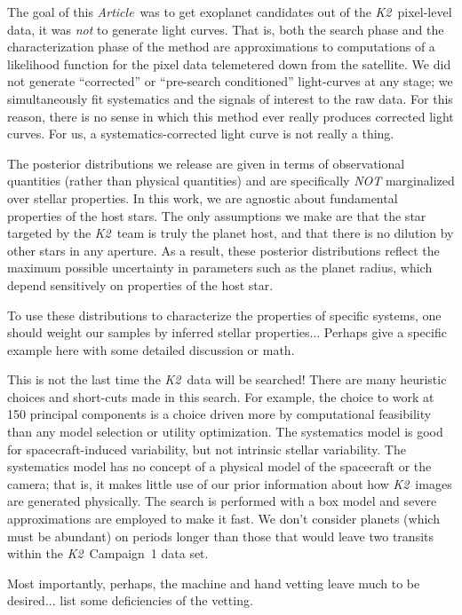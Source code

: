 \documentclass[12pt,preprint]{aastex}
\newcommand{\project}[1]{\textsl{#1}} %
\newcommand{\KT}{\project{K2}}
\newcommand{\paper}{\textsl{Article}}
\begin{document}
The goal of this \paper\ was to get exoplanet candidates out of the
\KT\ pixel-level data, it was \emph{not} to generate light curves.
That is, both the search phase and the characterization phase of the method
are approximations to computations of a likelihood function for the pixel
data telemetered down from the satellite.
We did not generate ``corrected'' or ``pre-search conditioned'' light-curves
at any stage; we simultaneously fit systematics and the signals of interest
to the raw data.
For this reason, there is no sense in which this method ever really
produces corrected light curves.
For us, a systematics-corrected light curve is not really a thing.

The posterior distributions we release are given in terms of observational
quantities (rather than physical quantities) and are specifically \emph{NOT}
marginalized over stellar properties.
In this work, we are agnostic about fundamental properties of the host stars.
The only assumptions we make are that the star targeted by the \KT\
team is truly the planet host, and that there is no dilution by other stars in
any aperture.
As a result, these posterior distributions reflect the maximum possible
uncertainty in parameters such as the planet radius, which depend sensitively
on properties of the host star.

To use these distributions to characterize the properties of specific systems,
one should weight our samples by inferred stellar properties...
Perhaps give a specific example here with some detailed discussion or math.

This is not the last time the \KT\ data will be searched!
There are many heuristic choices and short-cuts made in this search.
For example, the choice to work at 150 principal components is a choice
driven more by computational feasibility than any model selection or
utility optimization.
The systematics model is good for spacecraft-induced variability, but not
intrinsic stellar variability.
The systematics model has no concept of a physical model of the spacecraft or
the camera; that is, it makes little use of our prior information about how
\KT\ images are generated physically.
The search is performed with a box model and severe approximations are employed
to make it fast.
We don't consider planets (which must be abundant) on periods longer
than those that would leave two transits within the \KT\ Campaign~1
data set.

Most importantly, perhaps, the machine and hand vetting leave much to be desired...
list some deficiencies of the vetting.
\end{document}
